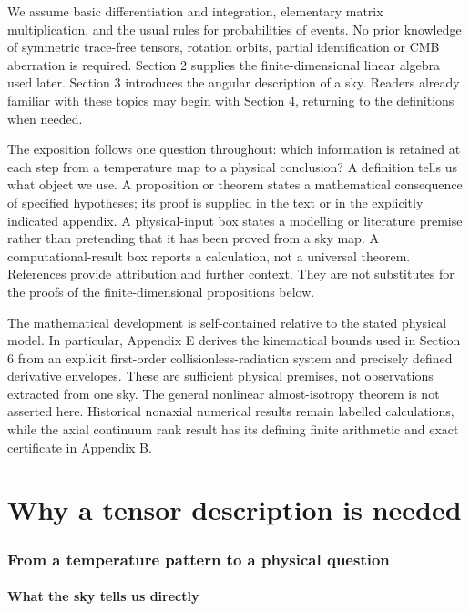 \documentclass[
  11pt,
  a4paper]{article}
\begin{document}
We assume basic differentiation and integration, elementary matrix multiplication, and the usual rules for probabilities of events. No prior knowledge of symmetric trace-free tensors, rotation orbits, partial identification or CMB aberration is required. Section 2 supplies the finite-dimensional linear algebra used later. Section 3 introduces the angular description of a sky. Readers already familiar with these topics may begin with Section 4, returning to the definitions when needed.

The exposition follows one question throughout: which information is retained at each step from a temperature map to a physical conclusion? A definition tells us what object we use. A proposition or theorem states a mathematical consequence of specified hypotheses; its proof is supplied in the text or in the explicitly indicated appendix. A physical-input box states a modelling or literature premise rather than pretending that it has been proved from a sky map. A computational-result box reports a calculation, not a universal theorem. References provide attribution and further context. They are not substitutes for the proofs of the finite-dimensional propositions below.

The mathematical development is self-contained relative to the stated physical model. In particular, Appendix E derives the kinematical bounds used in Section 6 from an explicit first-order collisionless-radiation system and precisely defined derivative envelopes. These are sufficient physical premises, not observations extracted from one sky. The general nonlinear almost-isotropy theorem is not asserted here. Historical nonaxial numerical results remain labelled calculations, while the axial continuum rank result has its defining finite arithmetic and exact certificate in Appendix B.

\clearpage
\part{Why a tensor description is needed}

\hypertarget{from-a-temperature-pattern-to-a-physical-question}{%
\section{From a temperature pattern to a physical question}\label{from-a-temperature-pattern-to-a-physical-question}}

\hypertarget{what-the-sky-tells-us-directly}{%
\subsection{What the sky tells us directly}\label{what-the-sky-tells-us-directly}}
\end{document}
